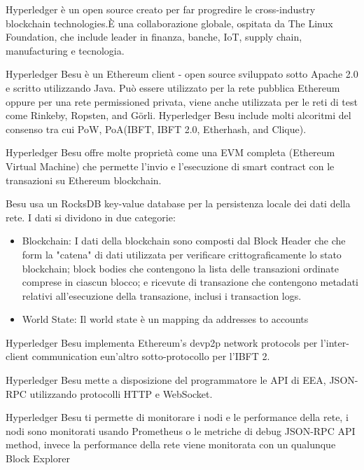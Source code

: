 \documentclass[12pt,titlepage]{report}
\begin{document}
Hyperledger è un open source creato per far progredire le cross-industry blockchain technologies.È una collaborazione globale, ospitata da The Linux Foundation, che include leader in finanza, banche, IoT, supply chain, manufacturing e tecnologia.

Hyperledger Besu è un Ethereum client - open source sviluppato sotto Apache 2.0 e scritto utilizzando Java. Può essere utilizzato per la rete pubblica Ethereum oppure per una rete permissioned privata, viene anche utilizzata per le reti di test come Rinkeby, Ropsten, and Görli. Hyperledger Besu include molti alcoritmi del consenso tra cui PoW, PoA(IBFT, IBFT 2.0, Etherhash, and Clique).

Hyperledger Besu offre molte proprietà come una EVM completa (Ethereum Virtual Machine) che permette l'invio e l'esecuzione di smart contract con le transazioni su Ethereum blockchain. 

Besu usa un RocksDB key-value database per la persistenza locale dei dati della rete. I dati si dividono in due categorie:
\begin{itemize}
\item Blockchain: I dati della blockchain sono composti dal Block Header che che form la "catena" di dati utilizzata per verificare crittograficamente lo stato blockchain; block bodies che contengono la lista delle transazioni ordinate comprese in ciascun blocco; e ricevute di transazione che contengono metadati relativi all'esecuzione della transazione, inclusi i transaction logs.
\item World State: Il world state è un mapping da addresses to accounts
\end{itemize}

Hyperledger Besu implementa Ethereum’s devp2p network protocols per l'inter-client communication eun'altro sotto-protocollo per l'IBFT 2.

Hyperledger Besu mette a disposizione del programmatore le API di  EEA, JSON-RPC utilizzando protocolli HTTP e WebSocket.

Hyperledger Besu ti permette di monitorare i nodi e le performance della rete, i nodi sono monitorati usando Prometheus o le metriche di debug JSON-RPC API method, invece la performance della rete viene monitorata con un qualunque Block Explorer
\end{document}
